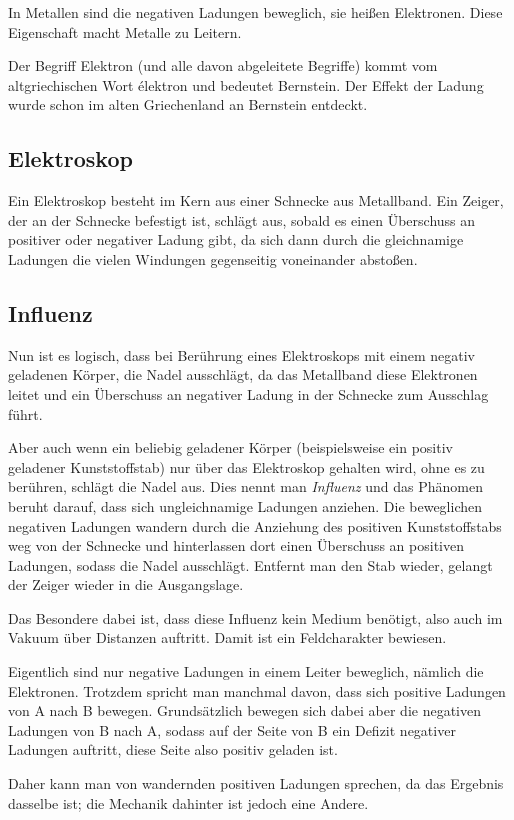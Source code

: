In Metallen sind die negativen Ladungen beweglich, sie heißen Elektronen. Diese Eigenschaft macht Metalle zu \glqq Leitern\grqq .

\begin{NiceToKnow}
Der Begriff Elektron (und alle davon abgeleitete Begriffe) kommt vom altgriechischen Wort \glqq élektron\grqq{} und bedeutet \glqq Bernstein\grqq . Der Effekt der Ladung wurde schon im alten Griechenland an Bernstein entdeckt.
\end{NiceToKnow}


\subsection{Elektroskop}	\label{subsec:Elektroskop}

Ein Elektroskop besteht im Kern aus einer Schnecke aus Metallband. Ein Zeiger, der an der Schnecke befestigt ist, schlägt aus, sobald es einen Überschuss an positiver oder negativer Ladung gibt, da sich dann durch die gleichnamige Ladungen die vielen Windungen gegenseitig voneinander abstoßen.


\subsection{Influenz} \label{subsec:Influenz}

Nun ist es logisch, dass bei Berührung eines Elektroskops mit einem negativ geladenen Körper, die Nadel ausschlägt, da das Metallband diese Elektronen leitet und ein Überschuss an negativer Ladung in der Schnecke zum Ausschlag führt.

Aber auch wenn ein beliebig geladener Körper (beispielsweise ein positiv geladener Kunststoffstab) nur über das Elektroskop gehalten wird, ohne es zu berühren, schlägt die Nadel aus. Dies nennt man \emph{Influenz} und das Phänomen beruht darauf, dass sich ungleichnamige Ladungen anziehen. Die beweglichen negativen Ladungen wandern durch die Anziehung des positiven Kunststoffstabs weg von der Schnecke und hinterlassen dort einen Überschuss an positiven Ladungen, sodass die Nadel ausschlägt. Entfernt man den Stab wieder, gelangt der Zeiger wieder in die Ausgangslage.

Das Besondere dabei ist, dass diese Influenz kein Medium benötigt, also auch im Vakuum über Distanzen auftritt. Damit ist ein Feldcharakter bewiesen.

\begin{Anmerkung}
Eigentlich sind nur negative Ladungen in einem Leiter beweglich, nämlich die Elektronen. Trotzdem spricht man manchmal davon, dass sich positive Ladungen von A nach B bewegen. Grundsätzlich bewegen sich dabei aber die negativen Ladungen von B nach A, sodass auf der Seite von B ein Defizit negativer Ladungen auftritt, diese Seite also positiv geladen ist.

Daher kann man von wandernden positiven Ladungen sprechen, da das Ergebnis dasselbe ist; die Mechanik dahinter ist jedoch eine Andere.
\end{Anmerkung}